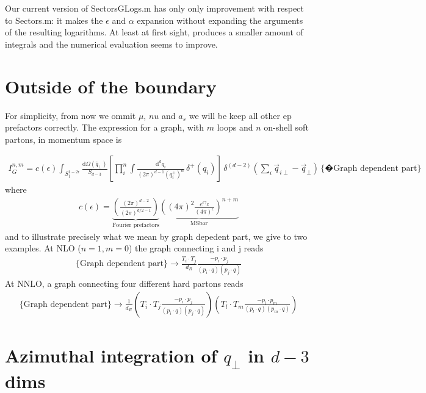 \documentclass[a4paper,11pt]{article}
\numberwithin{equation}{section}
\newcommand{\dd}{\text{d}}
\newcommand{\eps}{\epsilon}
\begin{document}
Our current version of SectorsGLogs.m has only only improvement with 
respect to Sectors.m: it makes the  $\epsilon$ and $\alpha$ expansion 
without expanding the arguments of the resulting logarithms. At least at 
first sight, produces a smaller amount of integrals and the numerical evaluation 
seems to improve. 

\newpage

\section{Outside of the boundary}

For simplicity, from now we ommit $\mu$, $nu$ and $a_s$
we will be keep all other ep prefactors correctly.
The expression for a graph, with $m$ loops and $n$ on-shell soft partons, in momentum space is

\begin{align}
I^{n,m}_G= c(\eps) 
\int_{S_1^{1-2\eps}}
 \frac{\dd \Omega(\hat{q}_\perp)}{S_{d-3}}  
\left[
 \prod_{i}^n \int \frac{\dd^{d} q_i}{(2\pi)^{d-1}(q^+_i)^\alpha}
 \, \delta^+(q_i)\right]\, 
\delta^{(d-2)}\left( \sum_i \vec q_{i\perp}-
\vec{q}_\perp\right)
\,\{�\text{Graph dependent part}\}
\end{align}
where
\begin{align} 
c(\eps)=
\underbrace{\left( 
\frac{(2\pi)^{d-2}}{(2\pi)^{d/2-1}}\right)}_{\text{Fourier prefactors}}
\underbrace{\left((4\pi)^2
\frac{e^{\eps \gamma_E}}{(4\pi)^\eps} \right)^{n+m}}_{\text{MSbar}}
\end{align}
and to illustrate precisely what we mean by graph depedent part, 
we give to two examples. At NLO ($n=1,m=0$) the graph connecting 
i and j reads
\begin{align}
\{\text{Graph dependent part}\}\to \frac{T_i\cdot T_j}{d_R}
\frac{-p_i\cdot p_j}{(p_i\cdot q)(p_j\cdot q)}  
\end{align}
At NNLO, a graph connecting four different hard partons reads
\begin{align}
\{\text{Graph dependent part}\}\to 
\frac{1}{d_R}\left( T_i\cdot T_j
\frac{-p_i\cdot p_j}{(p_i\cdot q)(p_j\cdot q)}  \right)
\left( T_l\cdot T_m
\frac{-p_l\cdot p_m}{(p_l\cdot q)(p_m\cdot q)}  \right)
\end{align}



\section{Azimuthal integration of $q_\perp$ in $d-3$ dims\label{section:averagedq}}
\end{document}

